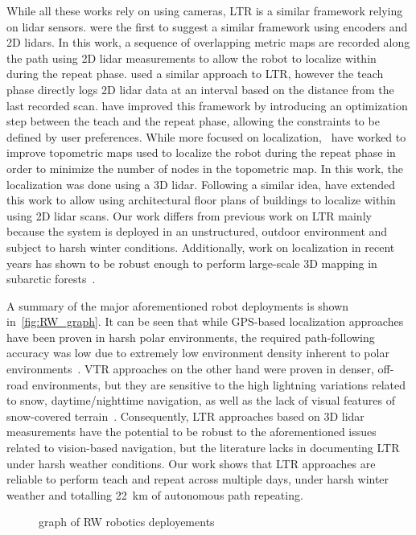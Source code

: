 While all these works rely on using cameras, \ac{LTR} is a similar framework relying on lidar sensors.
\citet{Marshall2008} were the first to suggest a similar framework using encoders and 2D lidars.
In this work, a sequence of overlapping metric maps are recorded along the path using 2D lidar measurements to allow the robot to localize within during the repeat phase.
\citet{Sprunk2013} used a similar approach to \ac{LTR}, however the teach phase directly logs 2D lidar data at an interval based on the distance from the last recorded scan.
\citet{Mazuran2015} have improved this framework by introducing an optimization step between the teach and the repeat phase, allowing the constraints to be defined by user preferences.
While more focused on localization,~\citet{Landry2016} have worked to improve topometric maps used to localize the robot during the repeat phase in order to minimize the number of nodes in the topometric map.
In this work, the localization was done using a 3D lidar. 
Following a similar idea, \citet{Boniardi2017} have extended this work to allow using architectural floor plans of buildings to localize within using 2D lidar scans.
Our work differs from previous work on \ac{LTR} mainly because the system is deployed in an unstructured, outdoor environment and subject to harsh winter conditions. 
Additionally, work on localization in recent years has shown to be robust enough to perform large-scale 3D mapping in subarctic forests~\citep{Babin2019}.


A summary of the major aforementioned robot deployments is shown in~\autoref{fig:RW_graph}.
It can be seen that while \ac{GPS}-based localization approaches have been proven in harsh polar environments, the required path-following accuracy was low due to extremely low environment density inherent to polar environments~\citep{Lever2013}.
\ac{VTR} approaches on the other hand were proven in denser, off-road environments, but they are sensitive to the high lightning variations related to snow, daytime/nighttime navigation, as well as the lack of visual features of snow-covered terrain~\citep{Paton2017}.
Consequently, \ac{LTR} approaches based on 3D lidar measurements have the potential to be robust to the aforementioned issues related to vision-based navigation, but the literature lacks in documenting \ac{LTR} under harsh weather conditions.
Our work shows that \ac{LTR} approaches are reliable to perform teach and repeat across multiple days, under harsh winter weather and totalling \SI{22}{km} of autonomous path repeating.

\begin{figure}[thbp]
	\centering
	
	\caption{graph of RW robotics deployements}
	\label{fig:RW_graph}
\end{figure}





